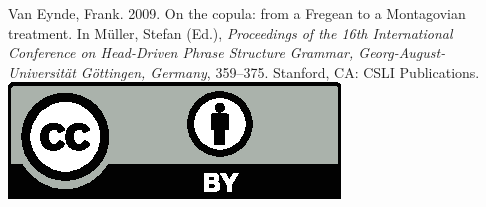 \documentclass[11pt,a4paper,fleqn]{article}
\begin{document}
\noindent



\vfill
\noindent
Van Eynde, Frank. 2009. On the copula: from a Fregean to a Montagovian treatment. In Müller, Stefan (Ed.), \emph{{Proceedings of the 16th International Conference on Head-Driven Phrase Structure Grammar, Georg-August-Universit\"{a}t G{\"o}ttingen, Germany}}, 359--375. Stanford,
CA: CSLI Publications. \hfill\href{http://creativecommons.org/licenses/by/4.0/}{\includegraphics[height=.75em]{Includes/ccby.eps}}

\newpage

\end{document}
